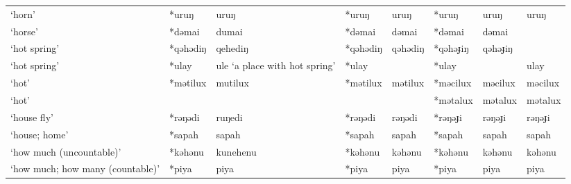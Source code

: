 \begin{landscape}
\begin{longtable}[c]{@{}p{3cm}<{\raggedright}p{2.75cm}<{\raggedright}p{2.75cm}<{\raggedright}p{2.75cm}<{\raggedright}p{2.75cm}<{\raggedright}p{2.75cm}<{\raggedright}p{2.75cm}<{\raggedright}p{2.75cm}<{\raggedright}@{}}
`horn'                                               & *uruŋ        & uruŋ                          & *uruŋ          & uruŋ                       & *uruŋ            & uruŋ                     & uruŋ                              \\
`horse'                                              & *dəmai       & dumai                         & *dəmai         & dəmai                      & *dəmai           & dəmai                    &                                   \\
`hot spring'                                         & *qəhədiŋ     & qehediŋ                       & *qəhədiŋ       & qəhədiŋ                    & *qəhəɟiŋ         & qəhəɟiŋ                  &                                   \\
`hot spring'                                         & *ulay        & ule `a place with hot spring' & *ulay          &                            & *ulay            &                          & ulay                              \\
`hot'                                                & *mətilux     & mutilux                       & *mətilux       & mətilux                    & *məcilux         & məcilux                  & məcilux                           \\
`hot'                                                &              &                               &                &                            & *mətalux         & mətalux                  & mətalux                           \\
`house fly'                                          & *rəŋədi      & ruŋedi                        & *rəŋədi        & rəŋədi                     & *rəŋəɟi          & rəŋəɟi                   & rəŋəɟi                            \\
`house; home'                                        & *sapah       & sapah                         & *sapah         & sapah                      & *sapah           & sapah                    & sapah                             \\
`how much (uncountable)'                             & *kəhənu      & kunehenu                      & *kəhənu        & kəhənu                     & *kəhənu          & kəhənu                   & kəhənu                            \\
`how much; how many (countable)'                     & *piya        & piya                          & *piya          & piya                       & *piya            & piya                     & piya                              \\

\end{longtable}
\end{landscape}
